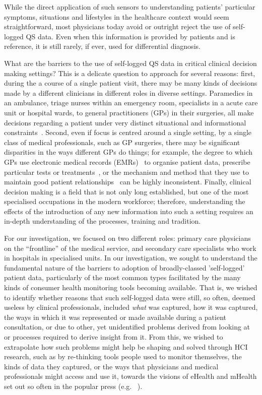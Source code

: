 \documentclass{sigchi}
\begin{document}
While the direct application of such sensors to understanding patients' particular symptoms, situations and lifestyles in the healthcare context would seem straightforward, most physicians today avoid or outright reject the use of self-logged QS data. Even when this information is provided by patients and is reference, it is still rarely, if ever, used for differential diagnosis.  

What are the barriers to the use of self-logged QS data in critical clinical decision making settings?  This is a delicate question to approach for several reasons: first, during the a course of a single patient visit, there may be many kinds of decisions made by a different clinicians in different roles in diverse settings.   Paramedics in an ambulance, triage nurses within an emergency room, specialists in a acute care unit or hospital wards, to general practitioners (GPs) in their surgeries, all make decisions regarding a patient under very distinct situational and informational constraints~\cite{croskerry}. Second, even if focus is centred around a single setting, by a single class of medical professionals, such as GP surgeries, there may be significant disparities in the ways different GPs do things; for example, the degree to which GPs use electronic medical records (EMRs)~\cite{hunt} to organise patient data, prescribe particular tests or treatments~\cite{}, or the mechanism and method that they use to maintain good patient relationships~\cite{} can be highly inconsistent. Finally, clinical decision making is a field that is not only long established, but one of the most specialised occupations in the modern workforce; therefore, understanding the effects of the introduction of any new information into such a setting requires an in-depth understanding of the processes, training and tradition.

For our investigation, we focused on two different roles: primary care physicians on the ``frontline'' of the medical service, and secondary care specialists who work in hospitals in specialised units.  In our investigation, we sought to understand the fundamental nature of the barriers to adoption of broadly-classed 'self-logged' patient data, particularly of the most common types facilitated by the many kinds of consumer health monitoring tools becoming available.  That is, we wished to identify whether reasons that such self-logged data were still, so often, deemed useless by clinical professionals, included \emph{what} was captured, how it was captured, the ways in which it was represented or made available during a patient consultation, or  due to other, yet unidentified problems derived from looking at or processes required to derive insight from it.  From this, we wished to extrapolate how such problems might help be shaping and solved through HCI research, such as by re-thinking tools people used to monitor themselves, the kinds of data they captured, or the ways that physicians and medical professionals might access and use it, towards the visions of eHealth and mHealth set out so often in the popular press (e.g. ~\cite{goetz, thingy, thingy}).
\end{document}
